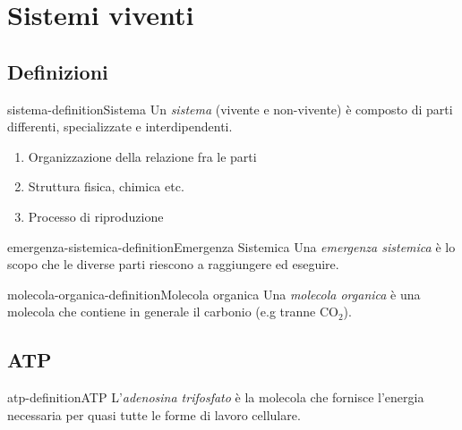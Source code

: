 \documentclass[preview]{standalone}
\begin{document}
\genpage

\section{Sistemi viventi}

\subsection{Definizioni}

\begin{snippetdefinition}{sistema-definition}{Sistema}
    Un \textit{sistema} (vivente e non-vivente) è composto di parti differenti, specializzate e interdipendenti. 
    
    \begin{enumerate}
        \item Organizzazione della relazione fra le parti
        \item Struttura fisica, chimica etc. 
        \item Processo di riproduzione
    \end{enumerate}
\end{snippetdefinition}

\begin{snippetdefinition}{emergenza-sistemica-definition}{Emergenza Sistemica}
    Una \textit{emergenza sistemica} è lo scopo che le diverse parti riescono a raggiungere ed eseguire.
\end{snippetdefinition}


\begin{snippetdefinition}{molecola-organica-definition}{Molecola organica}
    Una \textit{molecola organica} è una molecola che contiene in generale il carbonio (e.g tranne CO\({}_2\)).
\end{snippetdefinition}

\subsection{ATP}

\begin{snippetdefinition}{atp-definition}{ATP}
    L'\textit{adenosina trifosfato} è la molecola che fornisce l'energia necessaria per quasi tutte le forme
    di lavoro cellulare.
\end{snippetdefinition}
\end{document}
